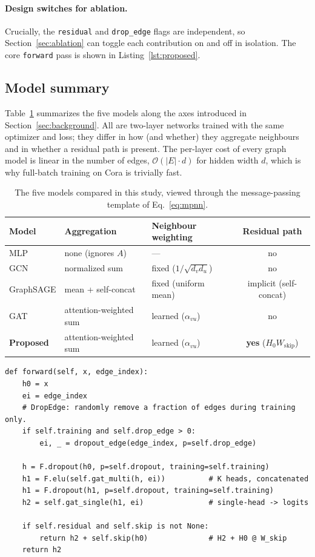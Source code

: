 \documentclass{article}
\begin{document}
\paragraph{Design switches for ablation.} Crucially, the \texttt{residual} and
\texttt{drop\_edge} flags are independent, so Section~\ref{sec:ablation} can toggle
each contribution on and off in isolation. The core \texttt{forward} pass is shown in
Listing~\ref{lst:proposed}.

\subsection{Model summary}
Table~\ref{tab:models} summarizes the five models along the axes introduced in
Section~\ref{sec:background}. All are two-layer networks trained with the same optimizer
and loss; they differ in how (and whether) they aggregate neighbours and in whether a
residual path is present. The per-layer cost of every graph model is linear in the
number of edges, $\mathcal{O}(|E| \cdot d)$ for hidden width $d$, which is why full-batch
training on Cora is trivially fast.

\begin{table}[h]
  \centering
  \caption{The five models compared in this study, viewed through the message-passing
  template of Eq.~\ref{eq:mpnn}.}
  \label{tab:models}
  \begin{tabular}{lllc}
    \toprule
    Model & Aggregation & Neighbour weighting & Residual path \\
    \midrule
    MLP        & none (ignores $A$)        & ---                       & no \\
    GCN        & normalized sum            & fixed ($1/\sqrt{d_v d_u}$) & no \\
    GraphSAGE  & mean + self-concat        & fixed (uniform mean)      & implicit (self-concat) \\
    GAT        & attention-weighted sum    & learned ($\alpha_{vu}$)   & no \\
    \textbf{Proposed} & attention-weighted sum & learned ($\alpha_{vu}$) & \textbf{yes} ($H_0 W_{\text{skip}}$) \\
    \bottomrule
  \end{tabular}
\end{table}

\begin{lstlisting}[caption={Proposed model forward pass (\texttt{src/models/proposed.py}).},label={lst:proposed}]
def forward(self, x, edge_index):
    h0 = x
    ei = edge_index
    # DropEdge: randomly remove a fraction of edges during training only.
    if self.training and self.drop_edge > 0:
        ei, _ = dropout_edge(edge_index, p=self.drop_edge)

    h = F.dropout(h0, p=self.dropout, training=self.training)
    h1 = F.elu(self.gat_multi(h, ei))          # K heads, concatenated
    h1 = F.dropout(h1, p=self.dropout, training=self.training)
    h2 = self.gat_single(h1, ei)               # single-head -> logits

    if self.residual and self.skip is not None:
        return h2 + self.skip(h0)              # H2 + H0 @ W_skip
    return h2
\end{lstlisting}
\end{document}
